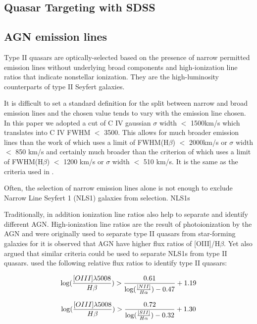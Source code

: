 \documentclass[preprint]{aastex}
\begin{document}
\subsection{Quasar Targeting with SDSS}

\subsection{AGN emission lines}

Type II quasars are optically-selected based on the presence of narrow permitted emission lines without underlying broad components and high-ionization line ratios that indicate nonstellar ionization.  They are the high-luminosity counterparts of type II Seyfert galaxies.

It is difficult to set a standard definition for the split between narrow and broad emission lines and the chosen value tends to vary with the emission line chosen.  In this paper we adopted a cut of C IV gaussian $\sigma$ width $<$ 1500km/s which translates into C IV FWHM $<$ 3500.  This allows for much broader emission lines than the work of  \cite{2003AJ....126.2125Z} which uses a limit of FWHM(H$\beta$) $<$ 2000km/s or $\sigma$ width $<$ 850 km/s and certainly much broader than the criterion of \cite{2005AJ....129.1783H} which uses a limit of  FWHM(H$\beta$) $<$ 1200 km/s or $\sigma$ width $<$ 510 km/s.  It is the same as the criteria used in \cite{hassen}.

Often, the selection of narrow emission lines alone is not enough to exclude Narrow Line Seyfert 1 (NLS1) galaxies from selection.  NLS1s 

Traditionally, in addition ionization line ratios also help to separate and identify different AGN.  High-ionization line ratios are the result of photoionization by the AGN and were originally used to separate type II quasars from star-forming galaxies for it is observed that AGN have higher flux ratios of [OIII]/H$\beta$.  Yet \cite{2003AJ....126.2125Z} also argued that similar criteria could be used to separate NLS1s from type II quasars. \cite{2003AJ....126.2125Z} used the following relative flux ratios to identify type II quasars:

\begin{equation}
\log({{[OIII] \lambda5008}\over{H\beta}}) > {{0.61}\over{\log({{[NII]}\over{H\alpha}})-0.47}} + 1.19 
\label{eq:z1}
\end{equation}

\begin{equation}
\log({{[OIII] \lambda5008}\over{H\beta}}) > {{0.72}\over{\log({{[SII]}\over{H\alpha}})-0.32}} + 1.30 
\label{eq:z2}
\end{equation}
\end{document}
